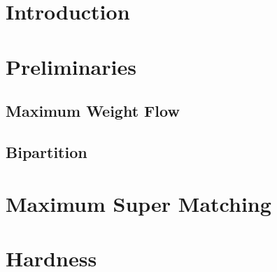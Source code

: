 \begin{abstract}

\end{abstract}

\section{Introduction}


\section{Preliminaries}
	\subsection{Maximum Weight Flow}
	
	\subsection{Bipartition}
	

\section{\FIXEDCARPOOL{}}


\section{\UWCARPOOL{}}


\section{\UCCARPOOL{}}


\section{Maximum Super Matching}


\section{\CARPOOL{}}


\section{Hardness}
